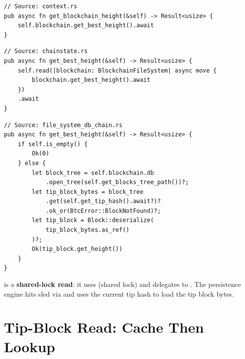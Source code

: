 \begin{listing}[htbp]
\caption{ delegates to service}
\label{lst:ch09-3-3}
\begin{verbatim}
// Source: context.rs
pub async fn get_blockchain_height(&self) -> Result<usize> {
    self.blockchain.get_best_height().await
}
\end{verbatim}
\end{listing}

\begin{listing}[htbp]
\caption{ acquires shared lock}
\label{lst:ch09-3-4}
\begin{verbatim}
// Source: chainstate.rs
pub async fn get_best_height(&self) -> Result<usize> {
    self.read(|blockchain: BlockchainFileSystem| async move {
        blockchain.get_best_height().await
    })
    .await
}
\end{verbatim}
\end{listing}

\begin{listing}[htbp]
\caption{ hits sled}
\label{lst:ch09-3-5}
\begin{verbatim}
// Source: file_system_db_chain.rs
pub async fn get_best_height(&self) -> Result<usize> {
    if self.is_empty() {
        Ok(0)
    } else {
        let block_tree = self.blockchain.db
            .open_tree(self.get_blocks_tree_path())?;
        let tip_block_bytes = block_tree
            .get(self.get_tip_hash().await?)?
            .ok_or(BtcError::BlockNotFound)?;
        let tip_block = Block::deserialize(
            tip_block_bytes.as_ref()
        )?;
        Ok(tip_block.get_height())
    }
}
\end{verbatim}
\end{listing}

\begin{notebox}
 is a \textbf{shared-lock read}: it uses  (shared lock) and delegates to . The persistence engine hits sled via  and uses the current tip hash to load the tip block bytes.
\end{notebox}

\section{Tip-Block Read: Cache Then Lookup}
\label{sec:ch09-3-tip-read}

